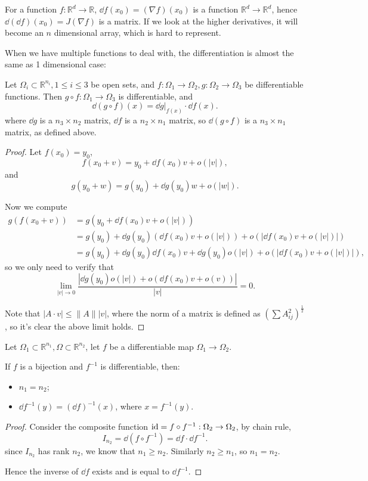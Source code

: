 For a function $f: \mathbb{R}^{d}\to \mathbb{R}$,
$\dd f(x_0) = (\nabla f)(x_0)$ is a function $\mathbb{R}^{d}\to \mathbb{R}^{d}$,
hence $\dd (\dd f)(x_0) = J(\nabla f)$ is a matrix.
If we look at the higher derivatives, it will become
an $n$ dimensional array, which is hard to represent.

When we have multiple functions to deal with,
the differentiation is almost the same as 1 dimensional case:
\begin{proposition}
	Let  $\Omega_i \subset \mathbb{R}^{n_i}, 1\le i\le 3$ be
	open sets, and $f: \Omega_1\to \Omega_2, g:\Omega_2\to \Omega_3$
	be differentiable functions.
	Then $g\circ f: \Omega_1\to \Omega_3$ is differentiable,
	and
	\[
	\dd (g\circ f)(x) = \dd g\big|_{f(x)} \cdot \dd f(x).
	\]
	where $\dd g$ is a $n_3\times n_2$ matrix,
	$\dd f$ is a $n_2\times n_1$ matrix, so $\dd(g\circ f)$ is
	a $n_3\times n_1$ matrix, as defined above.
\end{proposition}
\begin{proof}[Proof]
    Let $f(x_0) = y_0$,
	\[
		f(x_0+v) = y_0 + \dd f(x_0) v + o(|v|),
	\]
	and
	\[
		g(y_0+w) = g(y_0) + \dd g(y_0) w + o(|w|).
	\]

	Now we compute
	\begin{align*}
	g(f(x_0+v)) &= g(y_0+\dd f(x_0) v + o(|v|))\\
	&= g(y_0) + \dd g(y_0)(\dd f(x_0)v + o(|v|)) + o(|\dd f(x_0)v + o(|v|)|)\\
	&= g(y_0) + \dd g(y_0)\dd f(x_0) v + \dd g(y_0)o(|v|)
	+ o(|\dd f(x_0)v + o(|v|)|),
	\end{align*}
	so we only need to verify that
	\[
	\lim_{|v|\to 0} \frac{|\dd g(y_0)o(|v|) + o(\dd f(x_0)v + o(v))|}{|v|} = 0.
	\]

	Note that $|A\cdot v|\le \lVert A \rVert |v|$, where
	the norm of a matrix is defined as $(\sum A_{ij}^2)^{\frac{1}{2}}$,
	so it's clear the above limit holds.
\end{proof}

\begin{corollary}
    Let $\Omega_1 \subset \mathbb{R}^{n_1}, \Omega \subset \mathbb{R}^{n_2}$,
	let $f$ be a differentiable map $\Omega_1\to \Omega_2$.

	If $f$ is a bijection and $f^{-1}$ is differentiable, then:
	\begin{itemize}
		\item $n_1 = n_2$;
		\item $\dd f^{-1}(y) = (\dd f)^{-1} (x)$, where $x = f^{-1}(y)$.
	\end{itemize}
\end{corollary}
\begin{proof}[Proof]
    Consider the composite function $\operatorname{id} = f\circ f^{-1}: \Omega_2\to \Omega_2$,
	by chain rule,
	\[
	I_{n_2} = \dd (f\circ f^{-1}) = \dd f\cdot \dd f^{-1}.
	\]
	since $I_{n_2}$ has rank $n_2$, we know that $n_1\ge n_2$.
	Similarly $n_2\ge n_1$, so $n_1=n_2$.

	Hence the inverse of $\dd f$ exists and is equal to $\dd f^{-1}$.
\end{proof}

